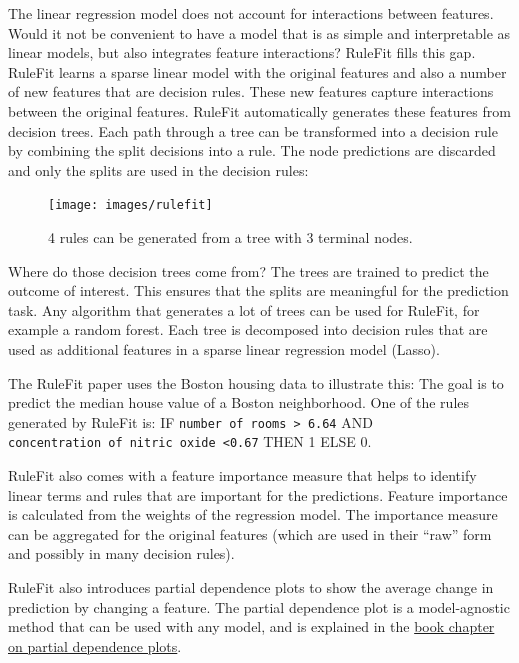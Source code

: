 \documentclass[
  11pt,
]{scrbook}
\begin{document}
The linear regression model does not account for interactions between features.
Would it not be convenient to have a model that is as simple and interpretable as linear models, but also integrates feature interactions?
RuleFit fills this gap.
RuleFit learns a sparse linear model with the original features and also a number of new features that are decision rules.
These new features capture interactions between the original features.
RuleFit automatically generates these features from decision trees.
Each path through a tree can be transformed into a decision rule by combining the split decisions into a rule.
The node predictions are discarded and only the splits are used in the decision rules:

\begin{figure}

{\centering \texttt{[image: images/rulefit]} 

}

\caption{4 rules can be generated from a tree with 3 terminal nodes.}\label{fig:rulefit-split}
\end{figure}

Where do those decision trees come from?
The trees are trained to predict the outcome of interest.
This ensures that the splits are meaningful for the prediction task.
Any algorithm that generates a lot of trees can be used for RuleFit, for example a random forest.
Each tree is decomposed into decision rules that are used as additional features in a sparse linear regression model (Lasso).

The RuleFit paper uses the Boston housing data to illustrate this:
The goal is to predict the median house value of a Boston neighborhood.
One of the rules generated by RuleFit is:
IF \texttt{number\ of\ rooms\ \textgreater{}\ 6.64} AND \texttt{concentration\ of\ nitric\ oxide\ \textless{}0.67} THEN 1 ELSE 0.

RuleFit also comes with a feature importance measure that helps to identify linear terms and rules that are important for the predictions.
Feature importance is calculated from the weights of the regression model.
The importance measure can be aggregated for the original features (which are used in their ``raw'' form and possibly in many decision rules).

RuleFit also introduces partial dependence plots to show the average change in prediction by changing a feature.
The partial dependence plot is a model-agnostic method that can be used with any model, and is explained in the \protect\hyperlink{pdp}{book chapter on partial dependence plots}.
\end{document}
